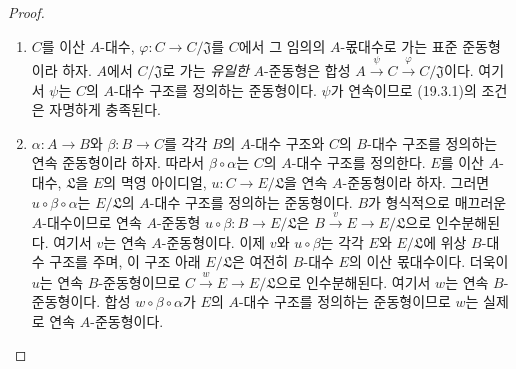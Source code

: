 
\begin{proof}
\begin{enumerate}
  \item[(i)] $C$를 이산 $A$-대수,
  $\varphi:C\to C/\mathfrak J$를 $C$에서 그 임의의 $A$-몫대수로 가는
  표준 준동형이라 하자. $A$에서 $C/\mathfrak J$로 가는
  \emph{유일한} $A$-준동형은 합성
  $A\xrightarrow{\psi}C\xrightarrow{\varphi}C/\mathfrak J$이다. 여기서
  $\psi$는 $C$의 $A$-대수 구조를 정의하는 준동형이다. $\psi$가
  연속이므로 (19.3.1)의 조건은 자명하게 충족된다.

  \item[(ii)] $\alpha:A\to B$와 $\beta:B\to C$를 각각 $B$의
  $A$-대수 구조와 $C$의 $B$-대수 구조를 정의하는 연속 준동형이라
  하자. 따라서 $\beta\circ\alpha$는 $C$의 $A$-대수 구조를 정의한다.
  $E$를 이산 $A$-대수, $\mathfrak L$을 $E$의 멱영 아이디얼,
  $u:C\to E/\mathfrak L$을 연속 $A$-준동형이라 하자. 그러면
  $u\circ\beta\circ\alpha$는 $E/\mathfrak L$의 $A$-대수 구조를
  정의하는 준동형이다. $B$가 형식적으로 매끄러운 $A$-대수이므로
  연속 $A$-준동형 $u\circ\beta:B\to E/\mathfrak L$은
  $B\xrightarrow{v}E\to E/\mathfrak L$으로 인수분해된다. 여기서 $v$는
  연속 $A$-준동형이다. 이제 $v$와 $u\circ\beta$는 각각 $E$와
  $E/\mathfrak L$에 위상 $B$-대수 구조를 주며, 이 구조 아래
  $E/\mathfrak L$은 여전히 $B$-대수 $E$의 이산 몫대수이다. 더욱이
  $u$는 연속 $B$-준동형이므로
  $C\xrightarrow{w}E\to E/\mathfrak L$으로 인수분해된다. 여기서 $w$는
  연속 $B$-준동형이다. 합성 $w\circ\beta\circ\alpha$가 $E$의
  $A$-대수 구조를 정의하는 준동형이므로 $w$는 실제로 연속
  $A$-준동형이다.


\end{enumerate}
\end{proof}
